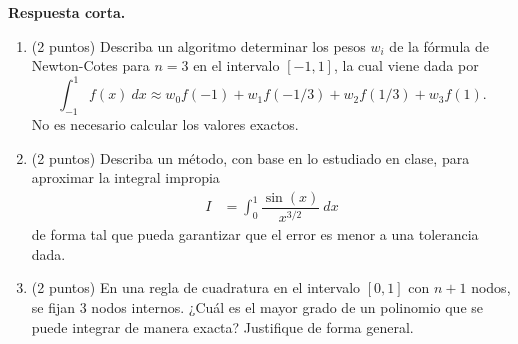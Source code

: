 \documentclass[12pt,final,twoside,notitlepage]{article}
\begin{document}
\textbf{Respuesta corta.}
\begin{enumerate}
\item (2 puntos) Describa un algoritmo determinar los pesos $w_i$ de la fórmula de Newton-Cotes para $n=3$ en el intervalo $[-1,1]$, la cual viene dada por $$\int_{-1}^1 f(x)\ dx \approx w_0 f(-1) + w_1 f(-1/3) + w_2 f(1/3)  + w_3f(1).$$ No es necesario calcular los valores exactos.

\item (2 puntos) Describa un método, con base en lo estudiado en clase, para aproximar la integral impropia 
\begin{align*}
I &= \int_0^1 \dfrac{\sin(x)}{x^{3/2}}\ dx
\end{align*}
de forma tal que pueda garantizar que el error es menor a una tolerancia dada.

\item (2 puntos) En una regla de cuadratura en el intervalo $[0,1]$ con $n+1$ nodos, se fijan 3 nodos internos. ¿Cuál es el mayor grado de un polinomio que se puede integrar de manera exacta? Justifique de forma general.

\end{enumerate}
\end{document}
